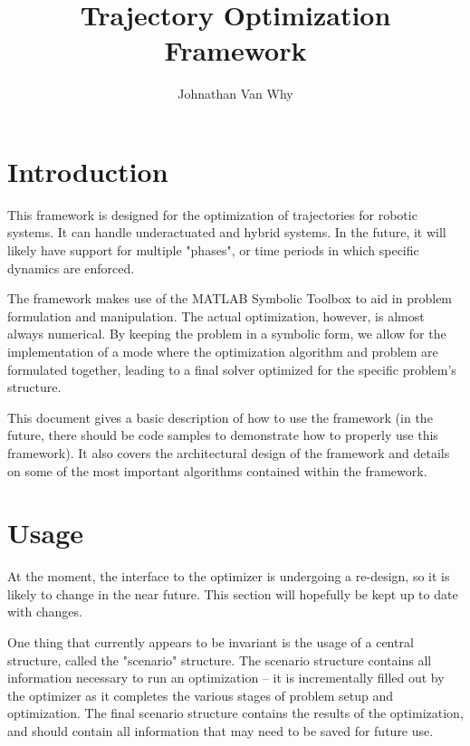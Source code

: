 \documentclass{article}
\title{Trajectory Optimization Framework}
\author{Johnathan Van Why}
\begin{document}
	\maketitle
	\section{Introduction}
		This framework is designed for the optimization of trajectories for robotic systems.
		It can handle underactuated and hybrid systems. In the future, it will likely have support for multiple
		"phases", or time periods in which specific dynamics are enforced.

		The framework makes use of the MATLAB Symbolic Toolbox to aid in problem formulation and manipulation.
		The actual optimization, however, is almost always numerical. By keeping the problem in a symbolic form, we
		allow for the implementation of a mode where the optimization algorithm and problem are formulated together, leading
		to a final solver optimized for the specific problem's structure.

		This document gives a basic description of how to use the framework (in the future, there should be code samples
		to demonstrate how to properly use this framework). It also covers the architectural design of the framework
		and details on some of the most important algorithms contained within the framework.

	\section{Usage}
		At the moment, the interface to the optimizer is undergoing a re-design, so it is likely to change in the near future.
		This section will hopefully be kept up to date with changes.

		One thing that currently appears to be invariant is the usage of a central structure, called the "scenario" structure.
		The scenario structure contains all information necessary to run an optimization -- it is incrementally filled out by the optimizer
		as it completes the various stages of problem setup and optimization. The final scenario structure contains the results of the optimization,
		and should contain all information that may need to be saved for future use.
\end{document}
